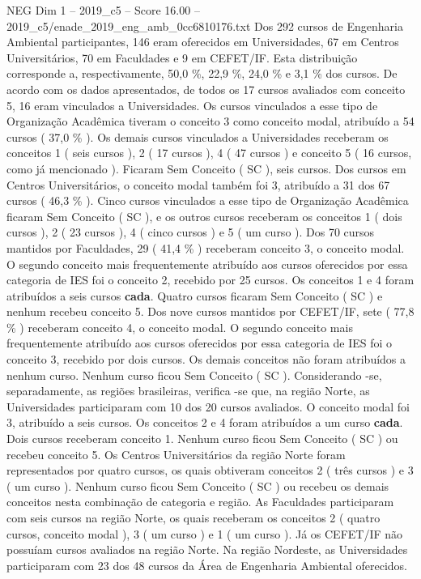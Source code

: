 \begin{textsample}{NEG Dim 1 – 2019\_c5 – Score 16.00 – 2019\_c5/enade\_2019\_eng\_amb\_0cc6810176.txt}
Dos 292 cursos de Engenharia Ambiental participantes, 146 eram oferecidos em Universidades, 67 em Centros Universitários, 70 em Faculdades e 9 em CEFET/IF.
Esta distribuição corresponde a, respectivamente, 50,0 \%, 22,9 \%, 24,0 \% e 3,1 \% dos cursos.
De acordo com os dados apresentados, de todos os 17 cursos avaliados com conceito 5, 16 eram vinculados a Universidades.
Os cursos vinculados a esse tipo de Organização Acadêmica tiveram o conceito 3 como conceito modal, atribuído a 54 cursos ( 37,0 \% ).
Os demais cursos vinculados a Universidades receberam os conceitos 1 ( seis cursos ), 2 ( 17 cursos ), 4 ( 47 cursos ) e conceito 5 ( 16 cursos, como já mencionado ).
Ficaram Sem Conceito ( SC ), seis cursos.
Dos cursos em Centros Universitários, o conceito modal também foi 3, atribuído a 31 dos 67 cursos ( 46,3 \% ).
Cinco cursos vinculados a esse tipo de Organização Acadêmica ficaram Sem Conceito ( SC ), e os outros cursos receberam os conceitos 1 ( dois cursos ), 2 ( 23 cursos ), 4 ( cinco cursos ) e 5 ( um curso ).
Dos 70 cursos mantidos por Faculdades, 29 ( 41,4 \% ) receberam conceito 3, o conceito modal.
O segundo conceito mais frequentemente atribuído aos cursos oferecidos por essa categoria de IES foi o conceito 2, recebido por 25 cursos.
Os conceitos 1 e 4 foram atribuídos a seis cursos \textbf{cada}.
Quatro cursos ficaram Sem Conceito ( SC ) e nenhum recebeu conceito 5.
Dos nove cursos mantidos por CEFET/IF, sete ( 77,8 \% ) receberam conceito 4, o conceito modal.
O segundo conceito mais frequentemente atribuído aos cursos oferecidos por essa categoria de IES foi o conceito 3, recebido por dois cursos.
Os demais conceitos não foram atribuídos a nenhum curso.
Nenhum curso ficou Sem Conceito ( SC ).
Considerando -se, separadamente, as regiões brasileiras, verifica -se que, na região Norte, as Universidades participaram com 10 dos 20 cursos avaliados.
O conceito modal foi 3, atribuído a seis cursos.
Os conceitos 2 e 4 foram atribuídos a um curso \textbf{cada}.
Dois cursos receberam conceito 1.
Nenhum curso ficou Sem Conceito ( SC ) ou recebeu conceito 5.
Os Centros Universitários da região Norte foram representados por quatro cursos, os quais obtiveram conceitos 2 ( três cursos ) e 3 ( um curso ).
Nenhum curso ficou Sem Conceito ( SC ) ou recebeu os demais conceitos nesta combinação de categoria e região.
As Faculdades participaram com seis cursos na região Norte, os quais receberam os conceitos 2 ( quatro cursos, conceito modal ), 3 ( um curso ) e 1 ( um curso ).
Já os CEFET/IF não possuíam cursos avaliados na região Norte.
Na região Nordeste, as Universidades participaram com 23 dos 48 cursos da Área de Engenharia Ambiental oferecidos.

\end{textsample}
